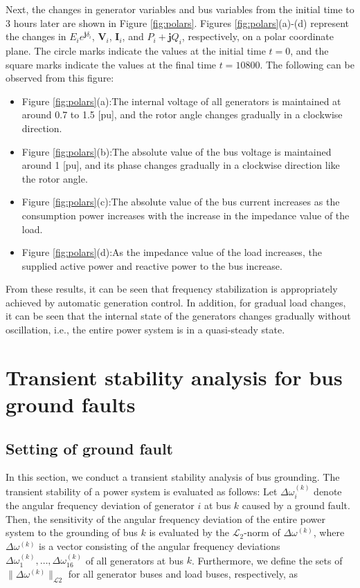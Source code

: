 \documentclass[graybox, envcountchap]{svmult}
\begin{document}
Next, the changes in generator variables and bus variables from the initial time
to 3 hours later are shown in Figure \ref{fig:polars}. Figures
\ref{fig:polars}(a)-(d) represent the changes in $E_ie^{\bm{j}\delta_i}$,
$\bm{V}_i$, $\bm{I}_i$, and $P_i+\bm{j}Q_i$, respectively, on a polar coordinate
plane. The circle marks indicate the values at the initial time $t=0$, and the
square marks indicate the values at the final time $t=10800$. The following can
be observed from this figure:

\begin{itemize}
  \item Figure \ref{fig:polars}(a):The internal voltage of all generators is
  maintained at around 0.7 to 1.5 [pu], and the rotor angle changes gradually in
  a clockwise direction.
  \item Figure \ref{fig:polars}(b):The absolute value of the bus voltage is
  maintained around 1 [pu], and its phase changes gradually in a clockwise
  direction like the rotor angle.
  \item Figure \ref{fig:polars}(c):The absolute value of the bus current
  increases as the consumption power increases with the increase in the
  impedance value of the load.
  \item Figure \ref{fig:polars}(d):As the impedance value of the load increases,
  the supplied active power and reactive power to the bus increase.
\end{itemize}

From these results, it can be seen that frequency stabilization is appropriately
achieved by automatic generation control. In addition, for gradual load changes,
it can be seen that the internal state of the generators changes gradually
without oscillation, i.e., the entire power system is in a quasi-steady state.

\section{Transient stability analysis for bus ground faults}\label{sec:IEEE68PSS}

\subsection{Setting of ground fault}

In this section, we conduct a transient stability analysis of bus grounding.
The transient stability of a power system is evaluated as follows: Let $\Delta
\omega_i^{(k)}$ denote the angular frequency deviation of generator $i$ at bus
$k$ caused by a ground fault. Then, the sensitivity of the angular frequency
deviation of the entire power system to the grounding of bus $k$ is evaluated by
the $\mathcal{L}_2$-norm of $\Delta \omega^{(k)}$, where $\Delta \omega^{(k)}$
is a vector consisting of the angular frequency deviations $\Delta
\omega_1^{(k)},\ldots,\Delta \omega_{16}^{(k)}$ of all generators at bus $k$.
Furthermore, we define the sets of $\|\Delta \omega^{(k)}\|_{\mathcal{L}2}$ for
all generator buses and load buses, respectively, as
\end{document}
